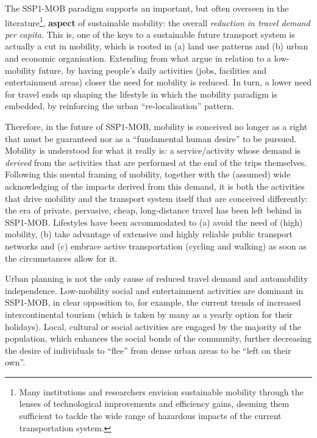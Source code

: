 The SSP1-MOB paradigm supports an important, but often overseen in the literature\footnote{Many institutions and researchers envision sustainable mobility through the lenses of technological improvements and efficiency gains, deeming them sufficient to tackle the wide range of hazardous impacts of the current transportation system.}, \textbf{aspect} of sustainable mobility: the overall \emph{reduction in travel demand per capita}. This is, one of the keys to a sustainable future transport system is actually a cut in mobility, which is rooted in (a) land use patterns and (b) urban and economic organisation. Extending from what \textcite{moriarty2008_Lowmobilityfuture} argue in relation to a low-mobility future, by having people's daily activities (jobs, facilities and entertainment areas) closer the need for mobility is reduced. In turn, a lower need for travel ends up shaping the lifestyle in which the mobility paradigm is embedded, by reinforcing the urban ``re-localisation'' pattern.

Therefore, in the future of SSP1-MOB, mobility is conceived no longer as a right that must be guaranteed nor as a ``fundamental human desire'' to be pursued. Mobility is understood for what it really is: a service/activity whose demand is \emph{derived} from the activities that are performed at the end of the trips themselves. Following this mental framing of mobility, together with the (assumed) wide acknowledging of the impacts derived from this demand, it is both the activities that drive mobility and the transport system itself that are conceived differently: the era of private, pervasive, cheap, long-distance travel has been left behind in SSP1-MOB. Lifestyles have been accommodated to (a) avoid the need of (high) mobility, (b) take advantage of extensive and highly reliable public transport networks and (c) embrace active transportation (cycling and walking) as soon as the circumstances allow for it.

Urban planning is not the only cause of reduced travel demand and automobility independence. Low-mobility social and entertainment activities are dominant in SSP1-MOB, in clear opposition to, for example, the current trends of increased intercontinental tourism (which is taken by many as a yearly option for their holidays). Local, cultural or social activities are engaged by the majority of the population, which enhances the social bonds of the community, further decreasing the desire of individuals to ``flee'' from dense urban areas to be ``left on their own''.

